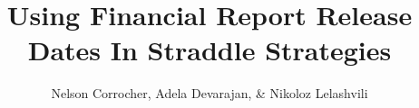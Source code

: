 \documentclass[english,man]{apa6}
\title{Using Financial Report Release Dates In Straddle Strategies}
\author{Nelson Corrocher, Adela Devarajan, \& Nikoloz Lelashvili}
\affiliation{
    \vspace{0.5cm}
          \textsuperscript{} Harrisburg University  }
\begin{document}
\maketitle



\hypertarget{refs}{}
\end{document}
